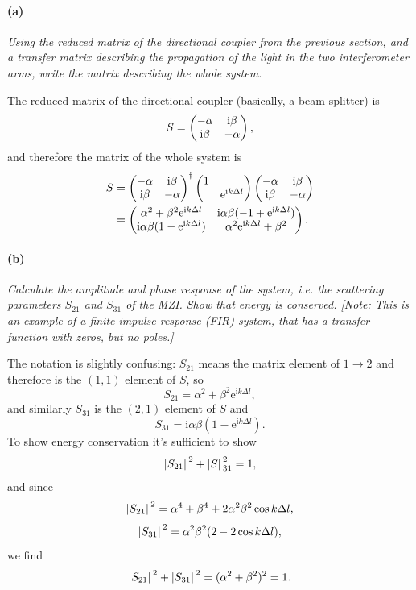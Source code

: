 \documentclass[hyperref, a4paper]{article}
\newcommand*{\ii}{\mathrm{i}}
\newcommand*{\ee}{\mathrm{e}}
\begin{document}
\paragraph*{(a)} \textit{Using the reduced matrix of the directional coupler from the previous section, and a transfer matrix describing the propagation of the light in the two interferometer arms, write the matrix describing the whole system.} 

The reduced matrix of the directional coupler (basically, a beam splitter) is 
\begin{equation}
    S = \pmqty{
        -\alpha & \ii \beta \\
        \ii \beta & - \alpha
    },
\end{equation}
and therefore the matrix of the whole system is 
\begin{equation}
    \begin{aligned}
        S &= \pmqty{
            -\alpha & \ii \beta \\
            \ii \beta & - \alpha
        }^\dagger
        \pmqty{
            1 & \\
            & \ee^{\ii k \Delta l}
        }
        \pmqty{
            -\alpha & \ii \beta \\
            \ii \beta & - \alpha
        } \\
        &= \pmqty{
            \alpha^2 + \beta^2 \ee^{\ii k \Delta l} & 
            \ii \alpha \beta (-1 + \ee^{\ii k \Delta l}) \\
            \ii \alpha \beta (1 - \ee^{\ii k \Delta l}) & 
            \alpha^2 \ee^{\ii k \Delta l} + \beta^2
        }.
    \end{aligned}
\end{equation}

\paragraph*{(b)} \textit{Calculate the amplitude and phase response of the system, i.e. the scattering parameters $S_{21}$ and $S_{31}$ of the MZI. Show that energy is conserved.
[Note: This is an example of a finite impulse response (FIR) system, that has a transfer function with zeros, but no poles.]} 

The notation is slightly confusing:
$S_{21}$ means the matrix element of $1 \to 2$ and therefore is the $(1, 1)$ element of $S$, so 
\begin{equation}
    S_{21} = \alpha^2 + \beta^2 \ee^{\ii k \Delta l}, 
\end{equation} 
and similarly $S_{31}$ is the $(2, 1)$ element of $S$ and 
\begin{equation}
    S_{31} = \ii \alpha \beta (1 - \ee^{\ii k \Delta l}).
\end{equation}
To show energy conservation it's sufficient to show 
\begin{equation}
    \abs*{S_{21}}^2 + \abs*{S}_{31}^2 = 1,
\end{equation}
and since 
\[
    \abs*{S_{21}}^2 = \alpha^4 + \beta^4 + 2 \alpha^2 \beta^2 \cos k \Delta l,
\]
\[
    \abs*{S_{31}}^2 = \alpha^2 \beta^2 (2 - 2 \cos k \Delta l),
\]
we find 
\[
    \abs*{S_{21}}^2 + \abs*{S_{31}}^2 = (\alpha^2 + \beta^2)^2 = 1.
\]
\end{document}

